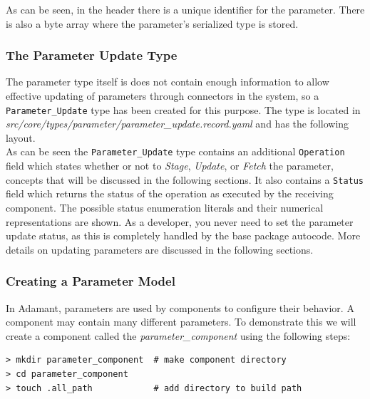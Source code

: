 


As can be seen, in the header there is a unique identifier for the parameter. There is also a byte array where the parameter's serialized type is stored. \\

\subsubsection{The Parameter Update Type} \label{The Parameter Update Type}

The parameter type itself is does not contain enough information to allow effective updating of parameters through connectors in the system, so a \texttt{Parameter\_Update} type has been created for this purpose. The type is located in \textit{src/core/types/parameter/parameter\_update.record.yaml} and has the following layout. \\



As can be seen the \texttt{Parameter\_Update} type contains an additional \texttt{Operation} field which states whether or not to \textit{Stage}, \textit{Update}, or \textit{Fetch} the parameter, concepts that will be discussed in the following sections. It also contains a \texttt{Status} field which returns the status of the operation as executed by the receiving component. The possible status enumeration literals and their numerical representations are shown. As a developer, you never need to set the parameter update status, as this is completely handled by the base package autocode.  More details on updating parameters are discussed in the following sections.

\subsubsection{Creating a Parameter Model}

In Adamant, parameters are used by components to configure their behavior. A component may contain many different parameters. To demonstrate this we will create a component called the \textit{parameter\_component} using the following steps:

\vspace{5mm} %
\begin{verbatim}
> mkdir parameter_component  # make component directory
> cd parameter_component 
> touch .all_path            # add directory to build path
\end{verbatim}
\vspace{5mm} %


